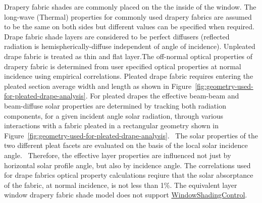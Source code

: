 Drapery fabric shades are commonly placed on the the inside of the window. The long-wave (Thermal) properties for commonly used drapery fabrics are assumed to be the same on both sides but different values can be specified when required. Drape fabric shade layers are considered to be perfect diffusers (reflected radiation is hemispherically-diffuse independent of angle of incidence). Unpleated drape fabric is treated as thin and flat layer.The off-normal optical properties of drapery fabric is determined from user specified optical properties at normal incidence using empirical correlations. Pleated drape fabric requires entering the pleated section average width and length as shown in Figure~\ref{fig:geometry-used-for-pleated-drape-analysis}. For pleated drapes the effective beam-beam and beam-diffuse solar properties are determined by tracking both radiation components, for a given incident angle solar radiation, through various interactions with a fabric pleated in a rectangular geometry shown in Figure~\ref{fig:geometry-used-for-pleated-drape-analysis}.~ The solar properties of the two different pleat facets are evaluated on the basis of the local solar incidence angle.~ Therefore, the effective layer properties are influenced not just by horizontal solar profile angle, but also by incidence angle. The correlations used for drape fabrics optical property calculations reqiure that the solar absorptance of the fabric, at normal incidence, is not less than 1\%. The equivalent layer window drapery fabric shade model does not support \hyperref[windowpropertyshadingcontrol]{WindowShadingControl}.

